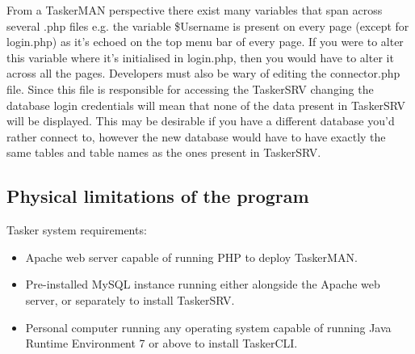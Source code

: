 \documentclass{project}
\begin{document}
From a TaskerMAN perspective there exist many variables that span across several .php files e.g. the variable \$Username is present on every page (except for login.php) as it's echoed on the top menu bar of every page. If you were to alter this variable where it's initialised in login.php, then you would have to alter it across all the pages. Developers must also be wary of editing the connector.php file. Since this file is responsible for accessing the TaskerSRV changing the database login credentials will mean that none of the data present in TaskerSRV will be displayed. This may be desirable if you have a different database you'd rather connect to, however the new database would have to have exactly the same tables and table names as the ones present in TaskerSRV.
\subsection{Physical limitations of the program}
Tasker system requirements:
\begin{itemize}
  \item Apache web server capable of running PHP to deploy TaskerMAN.
  \item Pre-installed MySQL instance running either alongside the Apache web server, or
    separately to install TaskerSRV.
  \item Personal computer running any operating system capable of running Java Runtime
    Environment 7 or above to install TaskerCLI.
\end{itemize}
\end{document}
